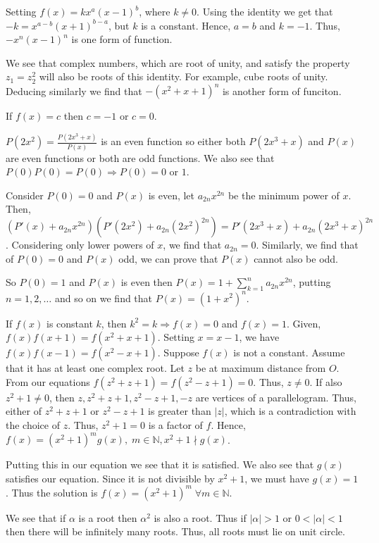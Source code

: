   Setting $f(x) = kx^a(x - 1)^b$, where $k\neq 0$. Using the identity we get that $-k = x^{a - b}(x +
  1)^{b - a}$, but $k$ is a constant. Hence, $a = b$ and $k = -1$. Thus, $-x^n(x - 1)^n$ is one form of
  function.

  We see that complex numbers, which are root of unity, and satisfy the property $z_1 = z_2^2$ will also be
  roots of this identity. For example, cube roots of unity. Deducing similarly we find that $-(x^2 + x +
  1)^n$ is another form of funciton.

  If $f(x) = c$ then $c = -1$ or $c = 0$.
\item $P(2x^2) = \frac{P(2x^3 + x)}{P(x)}$ is an even function so either both $P(2x^3 + x)$ and $P(x)$ are
  even functions or both are odd functions. We also see that $P(0)P(0) = P(0)\Rightarrow P(0) = 0$ or $1$.

  Consider $P(0) = 0$ and $P(x)$ is even, let $a_{2n}x^{2n}$ be the minimum power of $x$. Then, $(P'(x) +
  a_{2n}x^{2n})(P'(2x^2) + a_{2n}(2x^2)^{2n}) = P'(2x^3 + x) + a_{2n}(2x^3 + x)^{2n}$. Considering only
  lower powers of $x$, we find that $a_{2n} = 0$. Similarly, we find that of $P(0) = 0$ and $P(x)$ odd, we
  can prove that $P(x)$ cannot also be odd.

  So $P(0) = 1$ and $P(x)$ is even then $P(x) = 1 + \sum_{k=1}^na_{2n}x^{2n}$, putting $n = 1, 2, \ldots$
  and so on we find that $P(x) = (1 + x^2)^n$.
\item If $f(x)$ is constant $k$, then $k^2 = k \Rightarrow f(x) = 0$ and $f(x) = 1$. Given, $f(x)f(x + 1) =
  f(x^2 + x +1)$. Setting $x = x - 1$, we have $f(x)f(x - 1) = f(x^2 - x + 1)$. Suppose $f(x)$ is not a
  constant. Assume that it has at least one complex root. Let $z$ be at maximum distance from $O$. From our
  equations $f(z^2 + z + 1) = f(z^2 - z + 1) = 0$. Thus, $z\neq 0$. If also $z^2 + 1 \neq 0$, then $z, z^2 + z
  + 1, z^2 - z + 1, -z$ are vertices of a parallelogram. Thus, either of $z^2 + z + 1$ or $z^2 - z + 1$ is
  greater than $|z|$, which is a contradiction with the choice of $z$. Thus, $z^2 + 1 = 0$ is a factor of
  $f$. Hence, $f(x) = (x^2 + 1)^mg(x),\;m\in\mathbb{N}, x^2 + 1\nmid g(x)$.

  Putting this in our equation we see that it is satisfied. We also see that $g(x)$ satisfies our
  equation. Since it is not divisible by $x^2 + 1$, we must have $g(x) = 1$. Thus the solution is $f(x) =
  (x^2 + 1)^m\;\forall m\in\mathbb{N}$.
\item We see that if $\alpha$ is a root then $\alpha^2$ is also a root. Thus if $|\alpha| > 1$ or $0 < |\alpha|
  < 1$ then there will be infinitely many roots. Thus, all roots must lie on unit circle.

